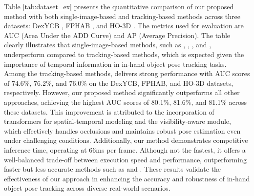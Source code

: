 
Table \ref{tab:dataset_ex} presents the quantitative comparison of our proposed method with both single-image-based and tracking-based methods across three datasets: DexYCB \cite{chao2021dexycb}, FPHAB \cite{garcia2018first}, and HO-3D \cite{hampali2020honnotate}. The metrics used for evaluation are AUC (Area Under the ADD Curve) and AP (Average Precision). The table clearly illustrates that single-image-based methods, such as \cite{billings2019silhonet}, \cite{peng2019pvnet}, \cite{wang2021gdr}, and \cite{castro2023crt}, underperform compared to tracking-based methods, which is expected given the importance of temporal information in in-hand object pose tracking tasks. Among the tracking-based methods, \cite{wang2023deep} delivers strong performance with AUC scores of 74.6\%, 76.2\%, and 76.0\% on the DexYCB, FPHAB, and HO-3D datasets, respectively. However, our proposed method significantly outperforms all other approaches, achieving the highest AUC scores of 80.1\%, 81.6\%, and 81.1\% across these datasets. This improvement is attributed to the incorporation of transformers for spatial-temporal modeling and the visibility-aware module, which effectively handles occlusions and maintains robust pose estimation even under challenging conditions. Additionally, our method demonstrates competitive inference time, operating at 66ms per frame. Although not the fastest, it offers a well-balanced trade-off between execution speed and performance, outperforming faster but less accurate methods such as \cite{castro2023crt} and \cite{wang2021gdr}. These results validate the effectiveness of our approach in enhancing the accuracy and robustness of in-hand object pose tracking across diverse real-world scenarios.


